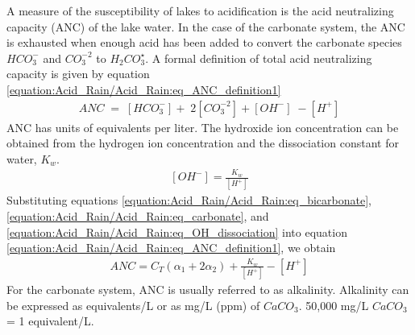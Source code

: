 \documentclass[letterpaper,10pt,english]{sphinxmanual}
\begin{document}
A measure of the susceptibility of lakes to acidification is the acid neutralizing capacity (ANC) of the lake water. In the case of the carbonate system, the ANC is exhausted when enough acid has been added to convert the carbonate species \({HCO}_{{3}}^{{-}}\)  and \({CO}_{{3}}^{{-2}}\) to \({H}_{{2}} {CO}_{{3}}^\star\). A formal definition of total acid neutralizing capacity is given by equation \eqref{equation:Acid_Rain/Acid_Rain:eq_ANC_definition1}
\begin{equation}\label{equation:Acid_Rain/Acid_Rain:eq_ANC_definition1}
\begin{split}{ANC\; }={\; }\left[{HCO}_{{3}}^{{-}} \right]+{\; 2}\left[{CO}_{{3}}^{{-2}} \right]+\left[{OH}^{{-}} \right]{\; -}\left[{H}^{+} \right]\end{split}
\end{equation}
ANC has units of equivalents per liter. The hydroxide ion concentration can be obtained from the hydrogen ion concentration and the dissociation constant for water, \(K_w\).
\begin{equation}\label{equation:Acid_Rain/Acid_Rain:eq_OH_dissociation}
\begin{split}\left[{OH}^{{-}} \right] = \frac{K_w}{\left[H^+\right]}\end{split}
\end{equation}
Substituting equations \eqref{equation:Acid_Rain/Acid_Rain:eq_bicarbonate}, \eqref{equation:Acid_Rain/Acid_Rain:eq_carbonate}, and \eqref{equation:Acid_Rain/Acid_Rain:eq_OH_dissociation} into equation \eqref{equation:Acid_Rain/Acid_Rain:eq_ANC_definition1}, we obtain
\begin{equation}\label{equation:Acid_Rain/Acid_Rain:eq_ANC_nonvolatile}
\begin{split}ANC=C_T \left(\alpha_1 +2\alpha_2 \right)+\frac{K_w}{\left[H^+ \right]} - \left[H^+ \right]\end{split}
\end{equation}
For the carbonate system, ANC is usually referred to as alkalinity. Alkalinity can be expressed as equivalents/L or as mg/L (ppm) of \(CaCO_3\). 50,000 mg/L \(CaCO_3\) = 1 equivalent/L.
\end{document}
